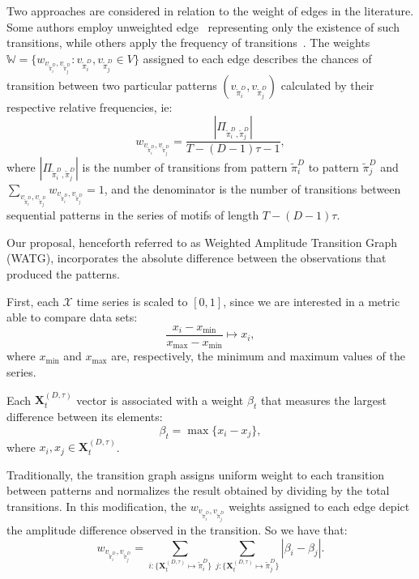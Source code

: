 \documentclass{isprs}
\begin{document}
	Two approaches are considered in relation to the weight of edges in the literature.
	Some authors employ unweighted edge~\cite{McCullough2015lagged,Kulp2016ordinal} representing only the existence of such transitions, while others apply the frequency of transitions~\cite{Sorrentino2015periodic,Zhang2017ConstructingOP}.
	The weights $\mathbb{W} = \{w_{v_{\widetilde{\pi}^D_i}, v_{\widetilde\pi^D_j}}: v_{\widetilde\pi^D_i}, v_{\widetilde\pi^D_j} \in V \}$ assigned to each edge describes the chances of transition between two particular patterns $(v_{\widetilde\pi^D_i}, v_{\widetilde\pi^D_j})$ calculated by their respective relative frequencies, ie:	
	\begin{equation}
	w_{v_{\widetilde\pi^D_i}, v_{\widetilde\pi^D_j}} = \frac{|\Pi_{\widetilde\pi^D_i,\widetilde\pi^D_j}|}{T-(D-1)\tau-1},
	\end{equation}
	where $|\Pi_{\widetilde\pi^D_i,\widetilde\pi^D_j}|$ is the number of transitions from pattern $\widetilde\pi^D_i$ to pattern $\widetilde\pi^D_j$ and $\sum_{v_{\widetilde\pi^D_i}, v_{\widetilde\pi^D_j}}w_{v_{\widetilde\pi^D_i}, v_{\widetilde\pi^D_j}} = 1$,
	and the denominator is the number of transitions between sequential patterns in the series of motifs of length $T-(D-1)\tau$.
	
	Our proposal, henceforth referred to as Weighted Amplitude Transition Graph (WATG), incorporates the absolute difference between the observations that produced the patterns.
	
	First, each $\mathcal{X}$ time series is scaled to $[0, 1]$, since we are interested in a metric able to compare data sets:
	\begin{equation}
	\frac{x_i - x_{\min}}{x_{\max} - x_{\min}} \longmapsto x_i,
	\end{equation}
	where $x_{\min}$ and $x_{\max}$ are, respectively, the minimum and maximum values of the series.
	
	Each $\mathbf{X}^{(D, \tau)}_t$ vector is associated with a weight $\beta_t$ that measures the largest difference between its elements:
	\begin{equation}
	\beta_t = \max\{x_i - x_j\},
	\end{equation}
	where $x_i, x_j \in \mathbf{X}^{(D, \tau)}_t$.
	
	Traditionally, the transition graph assigns uniform weight to each transition between patterns and normalizes the result obtained by dividing by the total transitions.
	In this modification, the $w_{v_{\widetilde\pi^D_i}, v_{\widetilde\pi^D_j}}$ weights assigned to each edge depict the amplitude difference observed in the transition.
	So we have that:	
	\begin{equation}
	w_{v_{\widetilde \pi^D_i}, v_{\widetilde \pi^D_j}} =  \sum_{i : \{\mathbf{X}^{(D,\tau)}_t \mapsto \widetilde\pi^D_i\}} \sum_{j : \{\mathbf{X}^{(D,\tau)}_t \mapsto \widetilde\pi^D_j\}} |\beta_i - \beta_j| .
	\end{equation}
	
\end{document}
